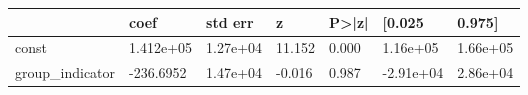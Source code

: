 \begin{tabular}{lllllll}
\toprule
 & coef & std err & z & P>|z| & [0.025 & 0.975] \\
\midrule
const &  1.412e+05 &  1.27e+04 &    11.152 &  0.000 &  1.16e+05 &  1.66e+05 \\
group_indicator &  -236.6952 &  1.47e+04 &    -0.016 &  0.987 & -2.91e+04 &  2.86e+04 \\
\bottomrule
\end{tabular}

